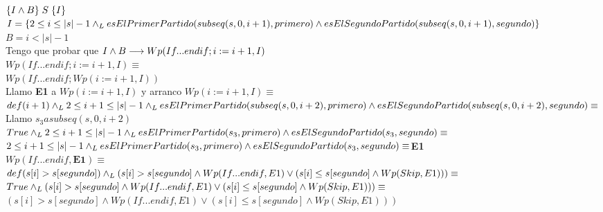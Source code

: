 \documentclass[10pt,a4paper]{article}
\begin{document}
\begin{enumerate}
\\
\underline{$\{I\land B\}\hspace{0.1cm}S\hspace{0.1cm}\{I\}$}
\vspace{0.3cm}
\\
$I = \{ 2\leq i \leq|s|-1 \land _L esElPrimerPartido(subseq(s, 0, i+1), primero) \land esElSegundoPartido(subseq(s, 0, i+1), segundo)\}$
\vspace{0.3cm}
\\
$B = i < |s|-1$
\vspace{0.3cm}
\\
Tengo que probar que $I\land B \longrightarrow Wp(If...endif; i:= i+1, I)$
\vspace{0.3cm}
\\
$Wp(If...endif; i:= i+1, I)\equiv$
\vspace{0.3cm}
\\
$Wp(If...endif; Wp(i:= i+1, I))$
\vspace{0.3cm}
\\
Llamo \textbf{E1} a $Wp(i:=i+1, I)$ y arranco $Wp(i:=i+1, I)\equiv$
$def(i+1)\land _L 2\leq i+1 \leq |s|-1 \land _L 
esElPrimerPartido(subseq(s,0, i+2), primero) \land esElSegundoPartido(subseq(s,0, i+2), segundo)\equiv$
\vspace{0.3cm}
\\
Llamo $s_3 a subseq(s, 0, i+2)$
\vspace{0.3cm}
\\
$True\land _L 2\leq i+1 \leq |s|-1 \land _L 
esElPrimerPartido(s_3, primero) \land esElSegundoPartido(s_3, segundo)\equiv$
\vspace{0.3cm}
\\
$2\leq i+1 \leq |s|-1 \land _L 
esElPrimerPartido(s_3, primero) \land esElSegundoPartido(s_3, segundo)\equiv$\textbf{E1}
\vspace{0.3cm}
\\
$Wp(If...endif, \textbf{E1})\equiv$
\vspace{0.3cm}
\\
$def(s[i]>s[segundo]) \land _L (s[i]>s[segundo] \land Wp(If...endif, E1)\lor (s[i]\leq s[segundo] \land Wp(Skip, E1)))\equiv$
\vspace{0.3cm}
\\
$True \land _L (s[i]>s[segundo] \land Wp(If...endif, E1)\lor (s[i]\leq s[segundo] \land Wp(Skip, E1)))\equiv$
\vspace{0.3cm}
\\
$(s[i]>s[segundo] \land Wp(If...endif, E1)\lor (s[i]\leq s[segundo] \land Wp(Skip, E1)))$
\vspace{0.3cm}

\end{enumerate}
\end{document}
